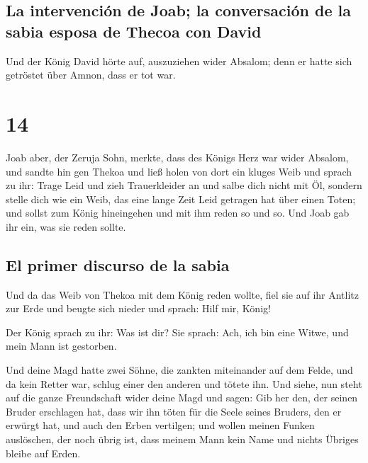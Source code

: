 \hypertarget{la-intervenciuxf3n-de-joab-la-conversaciuxf3n-de-la-sabia-esposa-de-thecoa-con-david}{%
\subsection{La intervención de Joab; la conversación de la sabia esposa
de Thecoa con
David}\label{la-intervenciuxf3n-de-joab-la-conversaciuxf3n-de-la-sabia-esposa-de-thecoa-con-david}}

 Und der König David hörte auf, auszuziehen wider
Absalom; denn er hatte sich getröstet über Amnon, dass er tot war.

\hypertarget{section-13}{%
\section{14}\label{section-13}}

 Joab aber, der Zeruja Sohn, merkte, dass des Königs Herz
war wider Absalom,  und sandte hin gen Thekoa und ließ
holen von dort ein kluges Weib und sprach zu ihr: Trage Leid und zieh
Trauerkleider an und salbe dich nicht mit Öl, sondern stelle dich wie
ein Weib, das eine lange Zeit Leid getragen hat über einen Toten;
 und sollst zum König hineingehen und mit ihm reden so und
so. Und Joab gab ihr ein, was sie reden sollte.

\hypertarget{el-primer-discurso-de-la-sabia}{%
\subsection{El primer discurso de la
sabia}\label{el-primer-discurso-de-la-sabia}}

 Und da das Weib von Thekoa mit dem König reden wollte,
fiel sie auf ihr Antlitz zur Erde und beugte sich nieder und sprach:
Hilf mir, König!

 Der König sprach zu ihr: Was ist dir? Sie sprach: Ach,
ich bin eine Witwe, und mein Mann ist gestorben.

 Und deine Magd hatte zwei Söhne, die zankten miteinander
auf dem Felde, und da kein Retter war, schlug einer den anderen und
tötete ihn.  Und siehe, nun steht auf die ganze
Freundschaft wider deine Magd und sagen: Gib her den, der seinen Bruder
erschlagen hat, dass wir ihn töten für die Seele seines Bruders, den er
erwürgt hat, und auch den Erben vertilgen; und wollen meinen Funken
auslöschen, der noch übrig ist, dass meinem Mann kein Name und nichts
Übriges bleibe auf Erden.

